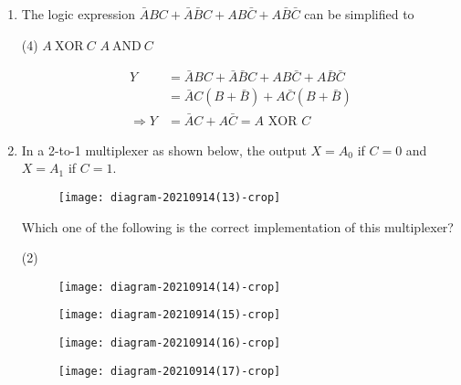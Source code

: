 \begin{enumerate}
	{	}
	\begin{tasks}(4)
	\end{tasks}
	\begin{answer}
		So the correct answer is \textbf{Option (D)}
	\end{answer}
	\item The logic expression $\bar{A} B C+\bar{A} \bar{B} C+A B \bar{C}+A \bar{B} \bar{C}$ can be simplified to
	{	}
	\begin{tasks}(4)
		\task[\textbf{A.}] $A\  \mathrm{XOR} \ C$
		\task[\textbf{B.}] $A \ \mathrm{AND} \ C$
	\end{tasks}
	\begin{answer}
		\begin{align*}
		Y&=\bar{A} B C+\bar{A} \bar{B} C+A B \bar{C}+A \bar{B} \bar{C}\\&=\bar{A} C(B+\bar{B})+A \bar{C}(B+\bar{B})\\
		\Rightarrow Y&=\bar{A} C+A \bar{C}=A\text{ XOR }C
		\end{align*}
	\end{answer}
	\item In a 2-to-1 multiplexer as shown below, the output $X=A_{0}$ if $C=0$ and $X=A_{1}$ if $C=1$.\\
	\begin{figure}[H]
		\centering
		\texttt{[image: diagram-20210914(13)-crop]}
	\end{figure}
	Which one of the following is the correct implementation of this multiplexer?
	{	}
	\begin{tasks}(2)
		\task[\textbf{A.}] \begin{figure}[H]
			\centering
			\texttt{[image: diagram-20210914(14)-crop]}
		\end{figure}
		\task[\textbf{B.}] \begin{figure}[H]
			\centering
			\texttt{[image: diagram-20210914(15)-crop]}
		\end{figure}
		\task[\textbf{C.}]\begin{figure}[H]
			\centering
			\texttt{[image: diagram-20210914(16)-crop]}
		\end{figure}
		\task[\textbf{D.}] \begin{figure}[H]
			\centering
			\texttt{[image: diagram-20210914(17)-crop]}

\end{figure}
\end{tasks}
\end{enumerate}
